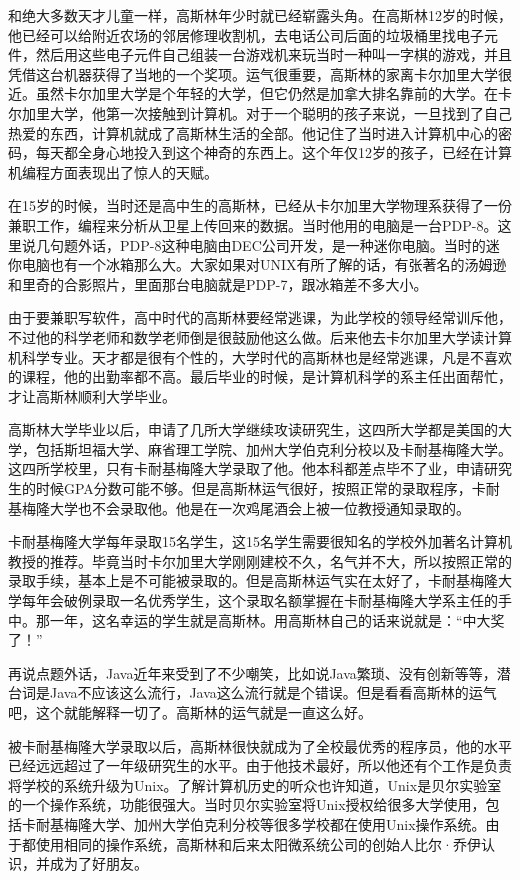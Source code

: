 \documentclass[
  letterpaper,
  DIV=11,
  numbers=noendperiod]{scrreprt}
\begin{document}
和绝大多数天才儿童一样，高斯林年少时就已经崭露头角。在高斯林12岁的时候，他已经可以给附近农场的邻居修理收割机，去电话公司后面的垃圾桶里找电子元件，然后用这些电子元件自己组装一台游戏机来玩当时一种叫一字棋的游戏，并且凭借这台机器获得了当地的一个奖项。运气很重要，高斯林的家离卡尔加里大学很近。虽然卡尔加里大学是个年轻的大学，但它仍然是加拿大排名靠前的大学。在卡尔加里大学，他第一次接触到计算机。对于一个聪明的孩子来说，一旦找到了自己热爱的东西，计算机就成了高斯林生活的全部。他记住了当时进入计算机中心的密码，每天都全身心地投入到这个神奇的东西上。这个年仅12岁的孩子，已经在计算机编程方面表现出了惊人的天赋。

在15岁的时候，当时还是高中生的高斯林，已经从卡尔加里大学物理系获得了一份兼职工作，编程来分析从卫星上传回来的数据。当时他用的电脑是一台PDP-8。这里说几句题外话，PDP-8这种电脑由DEC公司开发，是一种迷你电脑。当时的迷你电脑也有一个冰箱那么大。大家如果对UNIX有所了解的话，有张著名的汤姆逊和里奇的合影照片，里面那台电脑就是PDP-7，跟冰箱差不多大小。

由于要兼职写软件，高中时代的高斯林要经常逃课，为此学校的领导经常训斥他，不过他的科学老师和数学老师倒是很鼓励他这么做。后来他去卡尔加里大学读计算机科学专业。天才都是很有个性的，大学时代的高斯林也是经常逃课，凡是不喜欢的课程，他的出勤率都不高。最后毕业的时候，是计算机科学的系主任出面帮忙，才让高斯林顺利大学毕业。

高斯林大学毕业以后，申请了几所大学继续攻读研究生，这四所大学都是美国的大学，包括斯坦福大学、麻省理工学院、加州大学伯克利分校以及卡耐基梅隆大学。这四所学校里，只有卡耐基梅隆大学录取了他。他本科都差点毕不了业，申请研究生的时候GPA分数可能不够。但是高斯林运气很好，按照正常的录取程序，卡耐基梅隆大学也不会录取他。他是在一次鸡尾酒会上被一位教授通知录取的。

卡耐基梅隆大学每年录取15名学生，这15名学生需要很知名的学校外加著名计算机教授的推荐。毕竟当时卡尔加里大学刚刚建校不久，名气并不大，所以按照正常的录取手续，基本上是不可能被录取的。但是高斯林运气实在太好了，卡耐基梅隆大学每年会破例录取一名优秀学生，这个录取名额掌握在卡耐基梅隆大学系主任的手中。那一年，这名幸运的学生就是高斯林。用高斯林自己的话来说就是：``中大奖了！''

再说点题外话，Java近年来受到了不少嘲笑，比如说Java繁琐、没有创新等等，潜台词是Java不应该这么流行，Java这么流行就是个错误。但是看看高斯林的运气吧，这个就能解释一切了。高斯林的运气就是一直这么好。

被卡耐基梅隆大学录取以后，高斯林很快就成为了全校最优秀的程序员，他的水平已经远远超过了一年级研究生的水平。由于他技术最好，所以他还有个工作是负责将学校的系统升级为Unix。了解计算机历史的听众也许知道，Unix是贝尔实验室的一个操作系统，功能很强大。当时贝尔实验室将Unix授权给很多大学使用，包括卡耐基梅隆大学、加州大学伯克利分校等很多学校都在使用Unix操作系统。由于都使用相同的操作系统，高斯林和后来太阳微系统公司的创始人比尔·乔伊认识，并成为了好朋友。
\end{document}
